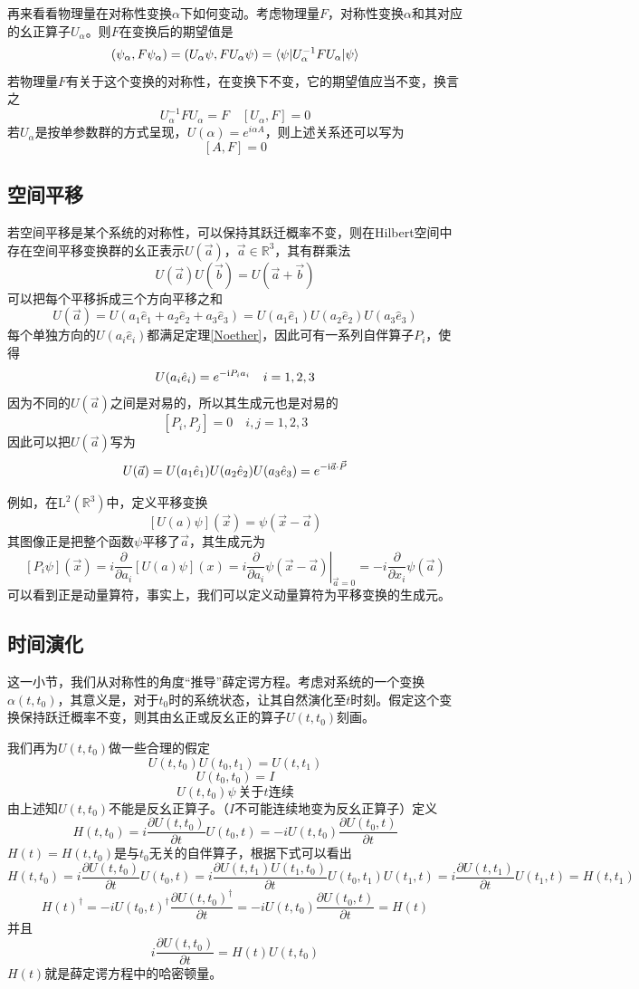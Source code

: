 再来看看物理量在对称性变换$\alpha$下如何变动。考虑物理量$F$，对称性变换$\alpha$和其对应的幺正算子$U_{\alpha}$。则$F$在变换后的期望值是
$$(\psi_\alpha,F\psi_\alpha)=(U_\alpha\psi,FU_\alpha\psi)=\braket{\psi|U^{-1}_\alpha FU_\alpha|\psi}$$
若物理量$F$有关于这个变换的对称性，在变换下不变，它的期望值应当不变，换言之
$$U^{-1}_\alpha FU_\alpha=F\quad [U_\alpha,F]=0$$
若$U_\alpha$是按单参数群的方式呈现，$U(\alpha)=e^{i\alpha A}$，则上述关系还可以写为
$$[A,F]=0$$
\subsection{空间平移}
若空间平移是某个系统的对称性，可以保持其跃迁概率不变，则在Hilbert空间中存在空间平移变换群的幺正表示$U(\vec{a})$，$\vec{a}\in\mathbb{R}^3$，其有群乘法
$$U(\vec{a})U(\vec{b})=U(\vec{a}+\vec{b})$$
可以把每个平移拆成三个方向平移之和
$$U(\vec{a})=U(a_1\hat{e}_1+a_2\hat{e}_2+a_3\hat{e}_3)=U(a_1\hat{e}_1)U(a_2\hat{e}_2)U(a_3\hat{e}_3)$$
每个单独方向的$U(a_i\hat{e}_i)$都满足定理\ref{Noether}，因此可有一系列自伴算子$P_i$，使得
$$U(a_i\hat{e}_i)=e^{-\mathrm{i} P_ia_i}\quad i=1,2,3$$
因为不同的$U(\vec{a})$之间是对易的，所以其生成元也是对易的
$$[P_i,P_j]=0\quad i,j=1,2,3$$
因此可以把$U(\vec{a})$写为
$$U(\vec{a})=U(a_1\hat{e}_1)U(a_2\hat{e}_2)U(a_3\hat{e}_3)=e^{-\mathrm{i}\vec{a}\cdot\vec{P}}$$

例如，在$\mathrm{L}^2(\mathbb{R}^3)$中，定义平移变换
$$\left[U(a)\psi\right](\vec{x})=\psi(\vec{x}-\vec{a})$$
其图像正是把整个函数$\psi$平移了$\vec{a}$，其生成元为
$$\left[P_i\psi\right](\vec{x})=i\frac{\partial}{\partial a_i}\left[U(a)\psi\right](x)=i\left.\frac{\partial}{\partial a_i}\psi(\vec{x}-\vec{a})\right|_{\vec{a}=0}=-i\frac{\partial}{\partial x_i}\psi(\vec{a})$$
可以看到正是动量算符，事实上，我们可以定义动量算符为平移变换的生成元。
\subsection{时间演化}
这一小节，我们从对称性的角度“推导”薛定谔方程。考虑对系统的一个变换$\alpha(t,t_0)$，其意义是，对于$t_0$时的系统状态，让其自然演化至$t$时刻。假定这个变换保持跃迁概率不变，则其由幺正或反幺正的算子$U(t,t_0)$刻画。

我们再为$U(t,t_0)$做一些合理的假定
$$U(t,t_0)U(t_0,t_1)=U(t,t_1)$$
$$U(t_0,t_0)=I$$
$$U(t,t_0)\psi\ \text{关于}t\text{连续}$$
由上述知$U(t,t_0)$不能是反幺正算子。（$I$不可能连续地变为反幺正算子）定义
$$H(t,t_0)=i\frac{\partial U(t,t_0)}{\partial t} U(t_0,t)=-iU(t,t_0)\frac{\partial U(t_0,t)}{\partial t}$$
$H(t)=H(t,t_0)$是与$t_0$无关的自伴算子，根据下式可以看出
$$H(t,t_0)=i\frac{\partial U(t,t_0)}{\partial t}U(t_0,t)=i\frac{\partial U(t,t_1)U(t_1,t_0)}{\partial t}U(t_0,t_1)U(t_1,t)=i\frac{\partial U(t,t_1)}{\partial t}U(t_1,t)=H(t,t_1)$$
$$H(t)^\dagger=-i U(t_0,t)^\dagger\frac{\partial U(t,t_0)^\dagger}{\partial t}=-iU(t,t_0)\frac{\partial U(t_0,t)}{\partial t}=H(t)$$
并且
$$i\frac{\partial U(t,t_0)}{\partial t}=H(t)U(t,t_0)$$
$H(t)$就是薛定谔方程中的哈密顿量。


